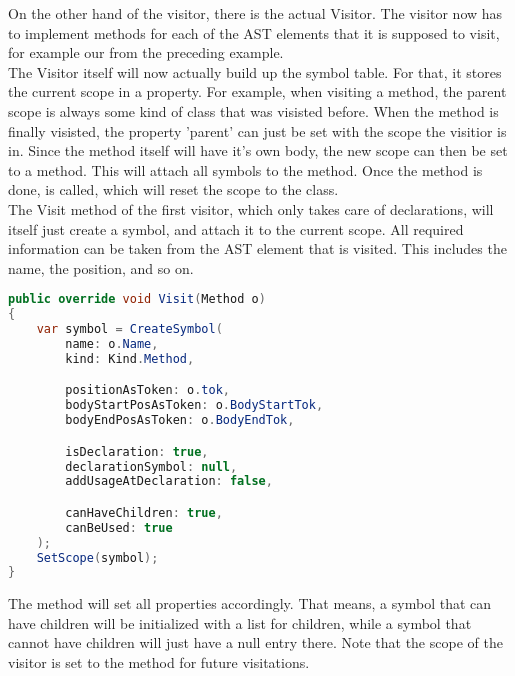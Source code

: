 On the other hand of the visitor, there is the actual Visitor. The visitor now has to implement  methods for each of the AST elements that it is supposed to visit, for example our  from the preceding example.\\

The Visitor itself will now actually build up the symbol table. For that, it stores the current scope in a property. For example, when visiting a method, the parent scope is always some kind of class that was visisted before. When the method is finally visisted, the property 'parent' can just be set with the scope the visitior is in. Since the method itself will have it's own body, the new scope can then be set to a method. This will attach all symbols to the method. Once the method is done,  is called, which will reset the scope to the class.\\

The Visit method of the first visitor, which only takes care of declarations, will itself just create a symbol, and attach it to the current scope. All required information can be taken from the AST element that is visited. This includes the name, the position, and so on.\\

\begin{lstlisting}[language=csharp, caption={Visiting a Method}, captionpos=b, label={lst:visitorvisit1}]
public override void Visit(Method o)
{
    var symbol = CreateSymbol(
        name: o.Name,
        kind: Kind.Method,

        positionAsToken: o.tok,
        bodyStartPosAsToken: o.BodyStartTok,
        bodyEndPosAsToken: o.BodyEndTok,

        isDeclaration: true,
        declarationSymbol: null,
        addUsageAtDeclaration: false,

        canHaveChildren: true,
        canBeUsed: true
    );
    SetScope(symbol);
}
\end{lstlisting}

The  method will set all properties accordingly. That means, a symbol that can have children will be initialized with a list for children, while a symbol that cannot have children will just have a null entry there. Note that the scope of the visitor is set to the method for future visitations.

